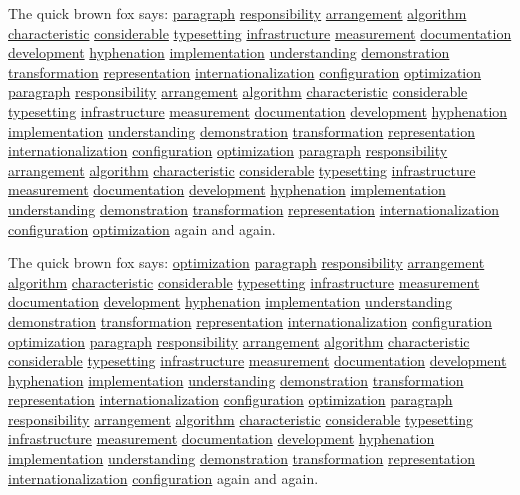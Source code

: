 \documentclass{article}
\begin{document}
The quick brown fox says: \underline{paragraph} \underline{responsibility} \underline{arrangement} \underline{algorithm} \underline{characteristic} \underline{considerable} \underline{typesetting} \underline{infrastructure} \underline{measurement} \underline{documentation} \underline{development} \underline{hyphenation} \underline{implementation} \underline{understanding} \underline{demonstration} \underline{transformation} \underline{representation} \underline{internationalization} \underline{configuration} \underline{optimization} \underline{paragraph} \underline{responsibility} \underline{arrangement} \underline{algorithm} \underline{characteristic} \underline{considerable} \underline{typesetting} \underline{infrastructure} \underline{measurement} \underline{documentation} \underline{development} \underline{hyphenation} \underline{implementation} \underline{understanding} \underline{demonstration} \underline{transformation} \underline{representation} \underline{internationalization} \underline{configuration} \underline{optimization} \underline{paragraph} \underline{responsibility} \underline{arrangement} \underline{algorithm} \underline{characteristic} \underline{considerable} \underline{typesetting} \underline{infrastructure} \underline{measurement} \underline{documentation} \underline{development} \underline{hyphenation} \underline{implementation} \underline{understanding} \underline{demonstration} \underline{transformation} \underline{representation} \underline{internationalization} \underline{configuration} \underline{optimization} again and again.

The quick brown fox says: \underline{optimization} \underline{paragraph} \underline{responsibility} \underline{arrangement} \underline{algorithm} \underline{characteristic} \underline{considerable} \underline{typesetting} \underline{infrastructure} \underline{measurement} \underline{documentation} \underline{development} \underline{hyphenation} \underline{implementation} \underline{understanding} \underline{demonstration} \underline{transformation} \underline{representation} \underline{internationalization} \underline{configuration} \underline{optimization} \underline{paragraph} \underline{responsibility} \underline{arrangement} \underline{algorithm} \underline{characteristic} \underline{considerable} \underline{typesetting} \underline{infrastructure} \underline{measurement} \underline{documentation} \underline{development} \underline{hyphenation} \underline{implementation} \underline{understanding} \underline{demonstration} \underline{transformation} \underline{representation} \underline{internationalization} \underline{configuration} \underline{optimization} \underline{paragraph} \underline{responsibility} \underline{arrangement} \underline{algorithm} \underline{characteristic} \underline{considerable} \underline{typesetting} \underline{infrastructure} \underline{measurement} \underline{documentation} \underline{development} \underline{hyphenation} \underline{implementation} \underline{understanding} \underline{demonstration} \underline{transformation} \underline{representation} \underline{internationalization} \underline{configuration} again and again.
\end{document}
